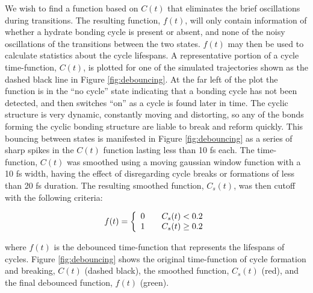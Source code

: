 We wish to find a function based on $C(t)$ that eliminates the brief oscillations during transitions. The resulting function, $f(t)$, will only contain information of whether a hydrate bonding cycle is present or absent, and none of the noisy oscillations of the transitions between the two states. $f(t)$ may then be used to calculate statistics about the cycle lifespans. A representative portion of a cycle time-function, $C(t)$, is plotted for one of the simulated trajectories shown as the dashed black line in Figure \ref{fig:debouncing}. At the far left of the plot the function is in the ``no cycle'' state indicating that a bonding cycle has not been detected, and then switches ``on'' as a cycle is found later in time. The cyclic structure is very dynamic, constantly moving and distorting, so any of the bonds forming the cyclic bonding structure are liable to break and reform quickly. This bouncing between states is manifested in Figure \ref{fig:debouncing} as a series of sharp spikes in the $C(t)$ function lasting less than 10 fs each. The time-function, $C(t)$ was smoothed using a moving gaussian window function with a 10 fs width, having the effect of disregarding cycle breaks or formations of less than 20 fs duration. The resulting smoothed function, $C_s(t)$, was then cutoff with the following criteria:

\[
  f(t) = \left\{ 
  \begin{array}{l l}
    0 & \quad C_s(t) < 0.2\\
    1 & \quad C_s(t) \geq 0.2\\
  \end{array} \right.
\]

where $f(t)$ is the debounced time-function that represents the lifespans of cycles. Figure \ref{fig:debouncing} shows the original time-function of cycle formation and breaking, $C(t)$ (dashed black), the smoothed function, $C_s(t)$ (red), and the final debounced function, $f(t)$ (green).


